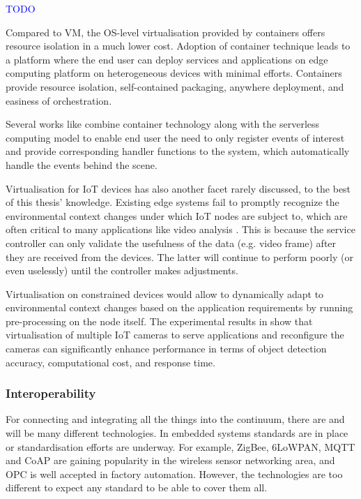 \documentclass{ieeeaccess}
\begin{document}
\textcolor{blue}{TODO}

Compared to VM, the OS-level virtualisation provided by containers offers resource isolation in a much lower cost. Adoption of container technique leads to a platform where the end user can deploy services and applications on edge computing platform on heterogeneous devices with minimal efforts. Containers provide resource isolation, self-contained packaging, anywhere deployment, and easiness of orchestration.

Several works like \cite{lavea} combine container technology along with the serverless computing model to enable end user the need to only register events of interest and provide corresponding handler functions to the system, which automatically handle the events behind the scene.

Virtualisation for IoT devices has also another facet rarely discussed, to the best of this thesis' knowledge. Existing edge systems fail to promptly recognize the environmental context changes under which IoT nodes are subject to, which are often critical to many applications like video analysis \cite{camera-virtualisation}. This is because the service controller can only validate the usefulness of the data (e.g. video frame) after they are received from the devices. The latter will continue to perform poorly (or even uselessly) until the controller makes adjustments.

Virtualisation on constrained devices would allow to dynamically adapt to environmental context changes based on the application requirements by running pre-processing on the node itself. The experimental results in \cite{camera-virtualisation} show that virtualisation of multiple IoT cameras to serve applications and reconfigure the cameras can significantly enhance performance in terms of object detection accuracy, computational cost, and response time.

\subsubsection{Interoperability}

For connecting and integrating all the things into the continuum, there are and will be many different technologies. In embedded systems standards are in place or standardisation efforts are underway. For example, ZigBee, 6LoWPAN, MQTT and CoAP \cite{mqtt-coap-amqp-http} are gaining popularity in the wireless sensor networking area, and OPC \cite{rest-opc} is well accepted in factory automation. However, the technologies are too different to expect any standard to be able to cover them all.
\end{document}
